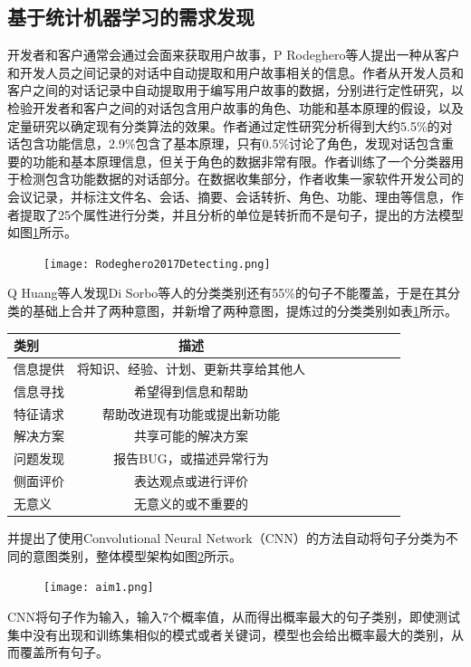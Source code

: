 \subsection{基于统计机器学习的需求发现}
开发者和客户通常会通过会面来获取用户故事，P Rodeghero等人\cite{Rodeghero2017Detecting}提出一种从客户和开发人员之间记录的对话中自动提取和用户故事相关的信息。作者从开发人员和客户之间的对话记录中自动提取用于编写用户故事的数据，分别进行定性研究，以检验开发者和客户之间的对话包含用户故事的角色、功能和基本原理的假设，以及定量研究以确定现有分类算法的效果。作者通过定性研究分析得到大约5.5\%的对话包含功能信息，2.9\%包含了基本原理，只有0.5\%讨论了角色，发现对话包含重要的功能和基本原理信息，但关于角色的数据非常有限。作者训练了一个分类器用于检测包含功能数据的对话部分。在数据收集部分，作者收集一家软件开发公司的会议记录，并标注文件名、会话、摘要、会话转折、角色、功能、理由等信息，作者提取了25个属性进行分类，并且分析的单位是转折而不是句子，提出的方法模型如图\ref{fig:Rodeghero2017Detecting}所示。
\begin{figure}[htbp]
    \centering
    \texttt{[image: Rodeghero2017Detecting.png]}
    \label{fig:Rodeghero2017Detecting}
\end{figure}

Q Huang等人\cite{Huang2018Automating}发现Di Sorbo等人的分类类别还有55\%的句子不能覆盖，于是在其分类的基础上合并了两种意图，并新增了两种意图，提炼过的分类类别如表\ref{tab:aim0}所示。
\begin{table}[htbp]
    \label{tab:aim0}
    \centering
    \footnotesize%
    \setlength{\tabcolsep}{4pt}%
    \renewcommand{\arraystretch}{1.2}%
\begin{tabular}{lcccccccc}
\hline
类别   & 描述                 \\
\hline
信息提供 & 将知识、经验、计划、更新共享给其他人 \\
信息寻找 & 希望得到信息和帮助          \\
特征请求 & 帮助改进现有功能或提出新功能     \\
解决方案 & 共享可能的解决方案          \\
问题发现 & 报告BUG，或描述异常行为      \\
侧面评价 & 表达观点或进行评价          \\
无意义  & 无意义的或不重要的         \\
\hline
\end{tabular}
\end{table}
并提出了使用Convolutional Neural Network（CNN）\cite{kim2014convolutional}的方法自动将句子分类为不同的意图类别，整体模型架构如图\ref{fig:aim1}所示。
\begin{figure}[htbp]
    \centering
    \texttt{[image: aim1.png]}
    \label{fig:aim1}
\end{figure}
CNN将句子作为输入，输入7个概率值，从而得出概率最大的句子类别，即使测试集中没有出现和训练集相似的模式或者关键词，模型也会给出概率最大的类别，从而覆盖所有句子。

